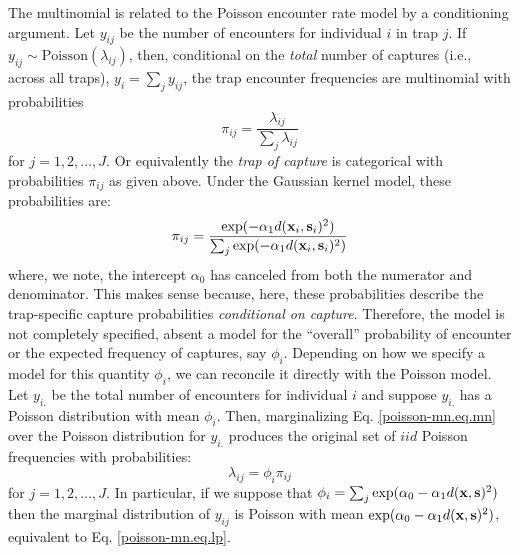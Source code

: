 The multinomial is related to the Poisson encounter rate model by a
conditioning argument. Let $y_{ij}$ be the number of encounters for
individual $i$ in trap $j$. If $y_{ij} \sim
\mbox{Poisson}(\lambda_{ij})$, then, conditional on the {\it total}
number of captures (i.e., across all traps), $y_{i} = \sum_{j}
y_{ij}$, the trap encounter frequencies are multinomial with
probabilities
\[
 \pi_{ij} =  \frac{ \lambda_{ij} } { \sum_{j} \lambda_{ij} }
\]
for $j=1,2,\ldots,J$.
Or equivalently the {\it trap of
  capture} is categorical with probabilities $\pi_{ij}$ as given above.
Under the Gaussian kernel model, these probabilities are:
\begin{equation}
\pi_{ij} =  \frac{ \exp(  -\alpha_{1}  d({\bf x}_{i},{\bf s}_{i})^2 ) }  {
   \sum_{j} \exp( -\alpha_{1} d({\bf x}_{i},{\bf s}_{i})^2)}
\label{poisson-mn.eq.mnprobs}
\end{equation}
where, we note, the intercept $\alpha_{0}$ has canceled from both the
numerator and denominator. This makes sense because, here, these
probabilities describe the trap-specific capture probabilities {\it
  conditional on capture}.  Therefore, the model is not completely
specified, absent a model for the ``overall'' probability of encounter
or the expected frequency of captures, say $\phi_{i}$. Depending on
how we specify a model for this quantity $\phi_{i}$, we can reconcile
it directly with the Poisson model.
Let $y_{i.}$ be the total number of encounters for individual $i$ and
suppose $y_{i.}$ has a Poisson distribution with mean $\phi_{i}$.
Then, marginalizing Eq. \ref{poisson-mn.eq.mn} over the Poisson
distribution for $y_{i.}$ produces the original set of
$iid$ %
Poisson
frequencies with probabilities:
\[
 \lambda_{ij} = \phi_{i} \pi_{ij}
\]
for $j=1,2,\ldots,J$.  In particular, if we suppose that $\phi_{i} =
\sum_{j} \exp(\alpha_{0} - \alpha_{1} d({\bf x},{\bf s})^2)$ then the
marginal distribution of $y_{ij}$ is Poisson with mean $\exp(
\alpha_{0} - \alpha_{1} d({\bf x},{\bf s})^2 )$, equivalent to
Eq. \ref{poisson-mn.eq.lp}.


